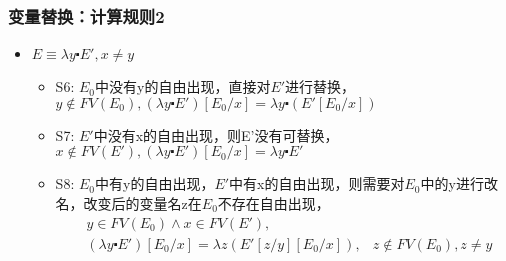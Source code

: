 \documentclass[CJKutf8,compress,hyperref]{beamer}
\begin{document}
\begin{CJK}{UTF8}{song}
\begin{frame}
  \frametitle{变量替换：计算规则2} 
  \begin{itemize}
  \item  $E \equiv \lambda y \centerdot E', x \neq y$ 
    \begin{itemize}
    \item {S6:} $E_0$中没有y的自由出现，直接对$E'$进行替换，
      $ y \not \in FV(E_0),   (\lambda y
      \centerdot E') [E_0/x] = \lambda y \centerdot
      (E'[E_0/x]) $
    \item {S7:} $E'$中没有x的自由出现，则E'没有可替换，
      $ x \not \in FV(E'),   (\lambda y \centerdot E')
      [E_0/x] = \lambda y
      \centerdot E' $
    \item{S8:}  $E_0$中有y的自由出现，$E'$中有x的自由出现，则需要对$E_0$中的y进行改名，改变后的变量名z在$E_0$不存在自由出现，   
      \begin{eqnarray*}
        &y \in FV(E_0) \wedge x \in FV(E'), & \\   
        & (\lambda y  \centerdot  E') [E_0/x] 
          = \lambda z  (E'[z/y]  [E_0/x]),  
                                            & z \not \in FV(E_0), z \neq y   
      \end{eqnarray*} 
    \end{itemize}
  \end{itemize}
\end{frame}


\end{CJK}
\end{document}
